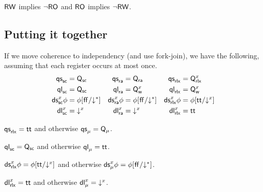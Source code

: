 $\RW$ implies $\lnot\RO$ and 
$\RO$ implies $\lnot\RW$.


\subsection{Putting it together}


If we move coherence to independency (and use fork-join), we have the
following, assuming that each register occurs at most once.
\begin{align*}
  \QS{}{\mSC}&=\Q{\mSC}
  &\QS{}{\mRA}&=\Q{\mRA}
  &\QS{}{\mRLX}&=\Qx{\aLoc}
  \\
  \QL{}{\mSC}&=\Q{\mSC}
  &\QL{}{\mRA}&=\Qw{\aLoc}
  &\QL{}{\mRLX}&=\Qw{\aLoc}
  \\
  \DS{\aLoc}{\mSC}{\aForm}&=\aForm[\FALSE/\D]
  &\DS{\aLoc}{\mRA}{\aForm}&=\aForm[\FALSE/\D]
  &\DS{\aLoc}{\mRLX}{\aForm}&=\aForm[\TRUE/\Dx{\aLoc}] 
  \\
  \DL{\aLoc}{\mSC}&=\Dx{\aLoc}
  &\DL{\aLoc}{\mRA}&=\Dx{\aLoc}
  &\DL{\aLoc}{\mRLX}&=\TRUE
\end{align*}

$\QS{}{\mRLX}=\TRUE$ and otherwise $\QS{}{\amode}=\Q{\amode}$.

$\QL{}{\mSC}=\Q{\mSC}$ and otherwise $\QL{}{\amode}=\TRUE$.

$\DS{\aLoc}{\mRLX}{\aForm}=\aForm[\TRUE/\Dx{\aLoc}]$ and otherwise
$\DS{\aLoc}{\amode}{\aForm}=\aForm[\FALSE/\D]$. 

$\DL{\aLoc}{\mRLX}=\TRUE$ and otherwise $\DL{\aLoc}{\amode}=\Dx{\aLoc}$.

